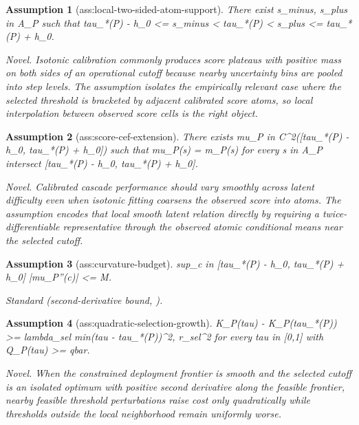 \documentclass{article}
\newtheorem{assumption}{Assumption}
\begin{document}
\begin{assumption}[ass:local-two-sided-atom-support]\label{ass:local-two-sided-atom-support}
There exist s_minus, s_plus in A_P such that tau_*(P) - h_0 <= s_minus < tau_*(P) < s_plus <= tau_*(P) + h_0.
\par\smallskip\noindent\emph{Novel.} Isotonic calibration commonly produces score plateaus with positive mass on both sides of an operational cutoff because nearby uncertainty bins are pooled into step levels. The assumption isolates the empirically relevant case where the selected threshold is bracketed by adjacent calibrated score atoms, so local interpolation between observed score cells is the right object.
\end{assumption}

\begin{assumption}[ass:score-cef-extension]\label{ass:score-cef-extension}
There exists mu_P in C^2([tau_*(P) - h_0, tau_*(P) + h_0]) such that mu_P(s) = m_P(s) for every s in A_P intersect [tau_*(P) - h_0, tau_*(P) + h_0].
\par\smallskip\noindent\emph{Novel.} Calibrated cascade performance should vary smoothly across latent difficulty even when isotonic fitting coarsens the observed score into atoms. The assumption encodes that local smooth latent relation directly by requiring a twice-differentiable representative through the observed atomic conditional means near the selected cutoff.
\end{assumption}

\begin{assumption}[ass:curvature-budget]\label{ass:curvature-budget}
sup_{c in [tau_*(P) - h_0, tau_*(P) + h_0]} |mu_P''(c)| <= M.
\par\smallskip\noindent\emph{Standard} (second-derivative bound, \cite{ArmstrongKolesar2020SimpleHonest}).
\end{assumption}

\begin{assumption}[ass:quadratic-selection-growth]\label{ass:quadratic-selection-growth}
K_P(tau) - K_P(tau_*(P)) >= lambda_sel min{(tau - tau_*(P))^2, r_sel^2} for every tau in [0,1] with Q_P(tau) >= qbar.
\par\smallskip\noindent\emph{Novel.} When the constrained deployment frontier is smooth and the selected cutoff is an isolated optimum with positive second derivative along the feasible frontier, nearby feasible threshold perturbations raise cost only quadratically while thresholds outside the local neighborhood remain uniformly worse.
\end{assumption}
\end{document}
